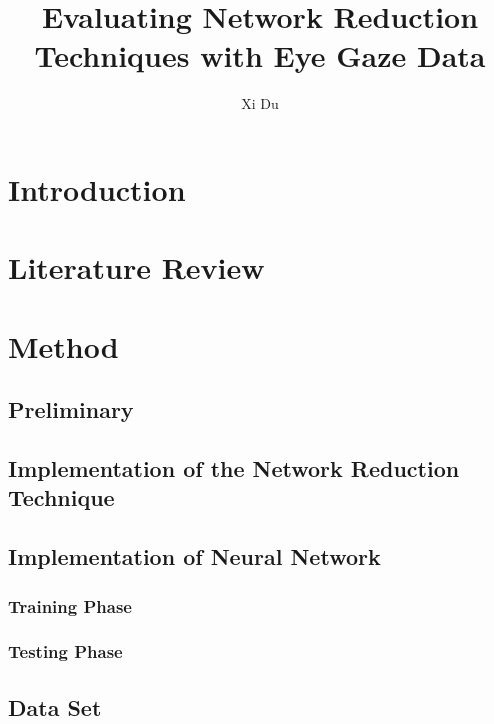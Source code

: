 \documentclass[runningheads]{llncs}
\begin{document}
\title{Evaluating Network Reduction Techniques with Eye Gaze Data}
\author{Xi Du}
\maketitle 
\begin{abstract}
\cite{method}

\end{abstract}

\section{Introduction}

\section{Literature Review}

\section{Method}

\subsection{Preliminary}

\subsection{Implementation of the Network Reduction Technique}

\subsection{Implementation of Neural Network}

\subsubsection{Training Phase}

\subsubsection{Testing Phase}

\subsection{Data Set}
\end{document}
